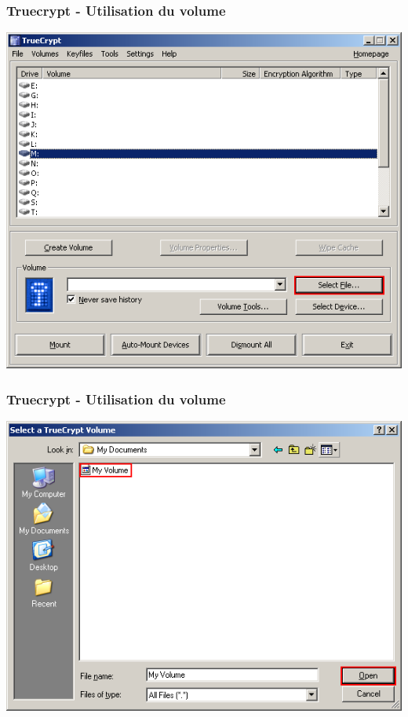 \documentclass{beamer}
\begin{document}
\begin{frame}
\frametitle{Truecrypt - Utilisation du volume}
\begin{center}
\includegraphics[scale=0.5] {./images/Truecrypt14.png} 
\end{center}
\end{frame}
\begin{frame}
\frametitle{Truecrypt - Utilisation du volume}
\begin{center}
\includegraphics[scale=0.5] {./images/Truecrypt15.png} 
\end{center}
\end{frame}
\end{document}
